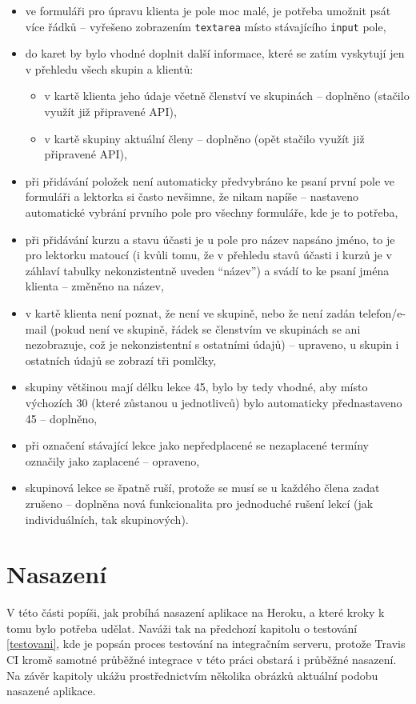         \begin{itemize}
            \item ve formuláři pro úpravu klienta je pole moc malé, je potřeba umožnit psát více řádků -- vyřešeno zobrazením \verb|textarea| místo stávajícího \verb|input| pole,
            \item do karet by bylo vhodné doplnit další informace, které se zatím vyskytují jen v přehledu všech skupin a klientů:
            \begin{itemize}
                \item v kartě klienta jeho údaje včetně členství ve skupinách -- doplněno (stačilo využít již připravené API),
                \item v kartě skupiny aktuální členy -- doplněno (opět stačilo využít již připravené API),
            \end{itemize} 
            \item při přidávání položek není automaticky předvybráno ke psaní první pole ve formuláři a lektorka si často nevšimne, že nikam napíše -- nastaveno automatické vybrání prvního pole pro všechny formuláře, kde je to potřeba,
            \item při přidávání kurzu a stavu účasti je u pole pro název napsáno jméno, to je pro lektorku matoucí (i kvůli tomu, že v přehledu stavů účasti i kurzů je v záhlaví tabulky nekonzistentně uveden \enquote{název}) a svádí to ke psaní jména klienta -- změněno na název,
            \item v kartě klienta není poznat, že není ve skupině, nebo že není zadán telefon/e-mail (pokud není ve skupině, řádek se členstvím ve skupinách se ani nezobrazuje, což je nekonzistentní s ostatními údajů) -- upraveno, u skupin i ostatních údajů se zobrazí tři pomlčky,
            \item skupiny většinou mají délku lekce 45, bylo by tedy vhodné, aby místo výchozích 30 (které zůstanou u jednotlivců) bylo automaticky přednastaveno 45 -- doplněno,
            \item při označení stávající lekce jako nepředplacené se nezaplacené termíny označily jako zaplacené -- opraveno,
            \item skupinová lekce se špatně ruší, protože se musí se u každého člena zadat zrušeno -- doplněna nová funkcionalita pro jednoduché rušení lekcí (jak individuálních, tak skupinových).
        \end{itemize}
        
        
\chapter{Nasazení}\label{nasazeni}
    V této části popíši, jak probíhá nasazení aplikace na Heroku, a které kroky k tomu bylo potřeba udělat. Naváži tak na předchozí kapitolu o testování \ref{testovani}, kde je popsán proces testování na integračním serveru, protože Travis CI kromě samotné průběžné integrace v této práci obstará i průběžné nasazení. Na závěr kapitoly ukážu prostřednictvím několika obrázků aktuální podobu nasazené aplikace.
    
